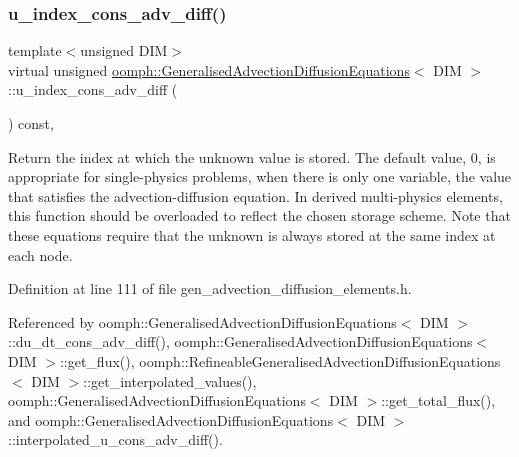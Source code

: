 \mbox{\label{classoomph_1_1GeneralisedAdvectionDiffusionEquations_a95e7c3bb9ff924a284fd83850f464967}} 
\subsubsection{\texorpdfstring{u\+\_\+index\+\_\+cons\+\_\+adv\+\_\+diff()}{u\_index\_cons\_adv\_diff()}}
{\footnotesize\ttfamily template$<$unsigned D\+IM$>$ \\
virtual unsigned \hyperlink{classoomph_1_1GeneralisedAdvectionDiffusionEquations}{oomph\+::\+Generalised\+Advection\+Diffusion\+Equations}$<$ D\+IM $>$\+::u\+\_\+index\+\_\+cons\+\_\+adv\+\_\+diff (\begin{DoxyParamCaption}{ }\end{DoxyParamCaption}) const\hspace{0.3cm}{\ttfamily [inline]}, {\ttfamily [virtual]}}



Return the index at which the unknown value is stored. The default value, 0, is appropriate for single-\/physics problems, when there is only one variable, the value that satisfies the advection-\/diffusion equation. In derived multi-\/physics elements, this function should be overloaded to reflect the chosen storage scheme. Note that these equations require that the unknown is always stored at the same index at each node. 



Definition at line 111 of file gen\+\_\+advection\+\_\+diffusion\+\_\+elements.\+h.



Referenced by oomph\+::\+Generalised\+Advection\+Diffusion\+Equations$<$ D\+I\+M $>$\+::du\+\_\+dt\+\_\+cons\+\_\+adv\+\_\+diff(), oomph\+::\+Generalised\+Advection\+Diffusion\+Equations$<$ D\+I\+M $>$\+::get\+\_\+flux(), oomph\+::\+Refineable\+Generalised\+Advection\+Diffusion\+Equations$<$ D\+I\+M $>$\+::get\+\_\+interpolated\+\_\+values(), oomph\+::\+Generalised\+Advection\+Diffusion\+Equations$<$ D\+I\+M $>$\+::get\+\_\+total\+\_\+flux(), and oomph\+::\+Generalised\+Advection\+Diffusion\+Equations$<$ D\+I\+M $>$\+::interpolated\+\_\+u\+\_\+cons\+\_\+adv\+\_\+diff().

